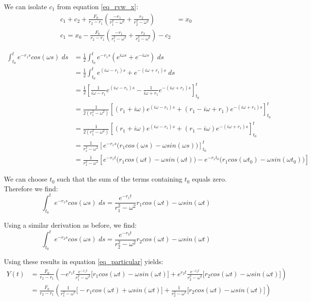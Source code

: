 
We can isolate $c_1$ from equation \ref{eq_rvw_x}:
\begin{align*}
	c_1  + c_2 +  \frac{F_0}{r_2 - r_1} \left(  \frac{-r_1}{r_1^2 - \omega^2} +  \frac{r_2}{r_2^2 - \omega^2}   \right) &= x_0 \\
	c_1 = x_0 -  \frac{F_0}{r_2 - r_1} \left(  \frac{-r_1}{r_1^2 - \omega^2} +  \frac{r_2}{r_2^2 - \omega^2}   \right)  - c_2
\end{align*}



\begin{align*}
	\int_{t_0}^t e^{-r_1 s} cos(\omega s) \; ds & = \frac{1}{2} \int_{t_0}^t e^{-r_1 s} (e^{i \omega s} + e^{-i \omega s}) \; ds \\
	& = \frac{1}{2} \int_{t_0}^t e^{(i \omega-r_1) s} +e^{-(i \omega + r_1)s}\; ds \\
	& = \frac{1}{2} \left[ \frac{1}{i \omega - r_1}  e^{(i \omega-r_1) s} - \frac{1}{i \omega + r_1}e^{-(i \omega + r_1)s} \right]^t_{t_0} \\
	& = \frac{1}{2(r_1^2 - \omega^2)} \left[ (r_1 + i \omega) e^{(i \omega-r_1) s} + (r_1 - i \omega + r_1)e^{-(i \omega + r_1)s} \right]^t_{t_0} \\
	& = \frac{1}{2(r_1^2 - \omega^2)} \left[ (r_1 + i \omega) e^{(i \omega-r_1) s} + (r_1 - i \omega)e^{-(i \omega + r_1)s} \right]^t_{t_0} \\
	& = \frac{1}{r_1^2 - \omega^2} \left[ e^{-r_1 s} 
	\big( r_1 cos(\omega s) - \omega sin(\omega s) \big)\right]^t_{t_0} \\
	& = \frac{1}{r_1^2 - \omega^2} \left[  e^{-r_1 t} \big( r_1 cos(\omega t) - \omega sin(\omega t) \big) - e^{-r_1 t_0} \big( r_1 cos(\omega t_0) - \omega sin(\omega t_0) \big) \right] 
\end{align*}

We can choose $t_0$ such that the sum of the terms containing $t_0$ equals zero. Therefore we find:
\begin{equation*}
	\int_{t_0}^t e^{-r_1 s} cos(\omega s) \; ds = \frac{e^{-r_1 t}}{r_1^2 - \omega^2}   r_1 cos(\omega t) - \omega sin(\omega t)
\end{equation*}

Using a similar derivation as before, we find:
\begin{equation*}
	\int_{t_0}^t e^{-r_2 s} cos(\omega s) \; ds= \frac{e^{-r_2 t}}{r_2^2 - \omega^2}   r_2 cos(\omega t) - \omega sin(\omega t)
\end{equation*}

Using these results in equation \ref{eq_particular} yields:
\begin{align*}
	Y(t) & = \frac{F_0}{r_2 - r_1} \left( - e^{r_1 t} \frac{e^{-r_1 t}}{r_1^2 - \omega^2}   \big[ r_1 cos(\omega t) - \omega sin(\omega t) \big] + e^{r_2 t} \frac{e^{-r_2 t}}{r_2^2 - \omega^2}   \big[ r_2 cos(\omega t) - \omega sin(\omega t) \big] \right) \\
	& = \frac{F_0}{r_2 - r_1} \left( \frac{1}{r_1^2 - \omega^2}   \big[- r_1 cos(\omega t) + \omega sin(\omega t) \big] +  \frac{1}{r_2^2 - \omega^2}   \big[ r_2 cos(\omega t) - \omega sin(\omega t) \big ]\right)
\end{align*}

